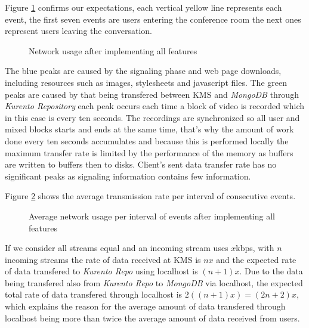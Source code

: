       Figure \ref{fig:test_full_features_net} confirms our expectations, each vertical yellow line represents each event, the first seven events are users entering the conference room the next ones represent users leaving the conversation. 
      


\begin{figure}[!htb]
  \begin{center}
    
  \end{center}
  \caption{Network usage after implementing all features}
  \label{fig:test_full_features_net}
\end{figure}

      The blue peaks are caused by the signaling phase and web page downloads, including resources such as images, stylesheets and javascript files. 
      The green peaks are caused by that being transfered between \ac{KMS} and \emph{MongoDB} through \emph{Kurento Repository} each peak occurs each time a block of video is recorded which in this case is every ten seconds. 
      The recordings are synchronized so all user and mixed blocks starts and ends at the same time, that's why the amount of work done every ten seconds accumulates and because this is performed locally the maximum transfer rate is limited by the performance of the memory as buffers are written to buffers then to disks. 
      Client's sent data transfer rate has no significant peaks as signaling information contains few information.

      Figure \ref{fig:summary_full_net} shows the average transmission rate per interval of consecutive events. 

\begin{figure}[!htb]
  \begin{center}
    
  \end{center}
  \caption{Average network usage per interval of events after implementing all features}
  \label{fig:summary_full_net}
\end{figure}

If we consider all streams equal and an incoming stream uses $x$kbps, with $n$ incoming streams the rate of data received at \ac{KMS} is $nx$ and the expected rate of data transfered to \emph{Kurento Repo} using localhost is $(n+1)x$. Due to the data being transfered also from \emph{Kurento Repo} to \emph{MongoDB} via localhost, the expected total rate of data transfered through localhost is $2((n+1)x) = (2n+2)x$, which explains the reason for the average amount of data transfered through localhost being more than twice the average amount of data received from users.

